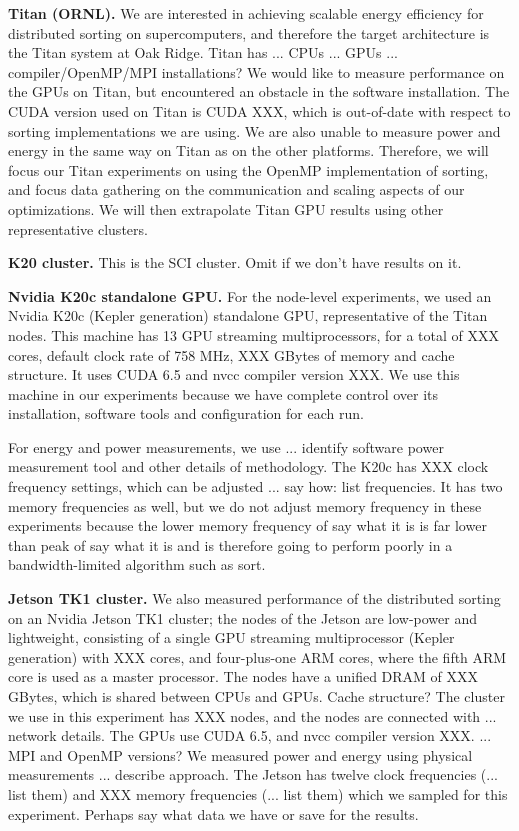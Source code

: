 \documentclass{sig-alternate}
\begin{document}
\noindent
{\bf Titan (ORNL).} 
We are interested in 
achieving scalable energy efficiency for distributed
sorting on supercomputers, and therefore the target architecture is the
Titan system at Oak Ridge.  Titan has 
{\color{red}... CPUs ... GPUs ...  compiler/OpenMP/MPI installations?}
We would like to measure performance on the GPUs on Titan, but encountered
an obstacle in the software installation.  
The CUDA version used on Titan is CUDA XXX, which is out-of-date with respect to
sorting implementations we are using.  We are also unable to measure
power and energy in the same way on Titan as on the other platforms.
Therefore, we will focus our
Titan experiments on using the OpenMP implementation of sorting, and focus
data gathering on the communication and scaling aspects of our optimizations.
We will then extrapolate
Titan GPU results using other representative clusters.

\noindent
{\bf K20 cluster.}
{\color{red} This is the SCI cluster.  Omit if we don't have results on it.}

\noindent
{\bf Nvidia K20c standalone GPU.}
For the node-level experiments, we used an Nvidia K20c (Kepler 
generation) standalone GPU, representative of the Titan nodes.  
This machine has 13 GPU streaming multiprocessors, 
for a total of XXX cores, default clock rate of 758 MHz,
XXX GBytes of memory and {\color{red} cache structure.}
It uses CUDA 6.5 and nvcc compiler version XXX.
We use this machine in our experiments because we have complete control 
over its installation, software tools and configuration for each run.

For energy and power measurements, we use {\color{red} 
... identify software power
measurement tool and other details of methodology}.  The K20c has XXX clock frequency settings,
which can be adjusted 
{\color{red} ... say how:
 list frequencies}.  It has two memory frequencies as well, 
but we do not adjust memory frequency in these experiments 
because the lower memory frequency of {\color{red} say what it is}
is far lower than peak of {\color{red} say what it is}
and is therefore going to perform poorly in a bandwidth-limited
algorithm such as sort.

\noindent
{\bf Jetson TK1 cluster.}
We also measured performance of the distributed sorting on an Nvidia 
Jetson TK1 cluster; the nodes of the Jetson are low-power and lightweight,
consisting of a single GPU streaming multiprocessor (Kepler generation)
with XXX cores, and 
four-plus-one ARM cores, where the fifth ARM core is used as a master processor.
The nodes have a unified DRAM of XXX GBytes, which is shared between CPUs and
GPUs.  {\color{red} Cache structure?} 
The cluster we use in this experiment has XXX nodes, and
the nodes are connected with {\color{red} ... network details.}
The GPUs use CUDA 6.5, and nvcc compiler version XXX.  {\color{red} ...
MPI and OpenMP versions?} We measured power and energy 
using physical measurements {\color{red} ... describe approach.}
The Jetson has twelve clock frequencies {\color{red} (... list them)}
and XXX memory frequencies  {\color{red} (... list them)}
which we sampled for this experiment. {\color{red} Perhaps
say what data we have or save for the results.}
\end{document}

